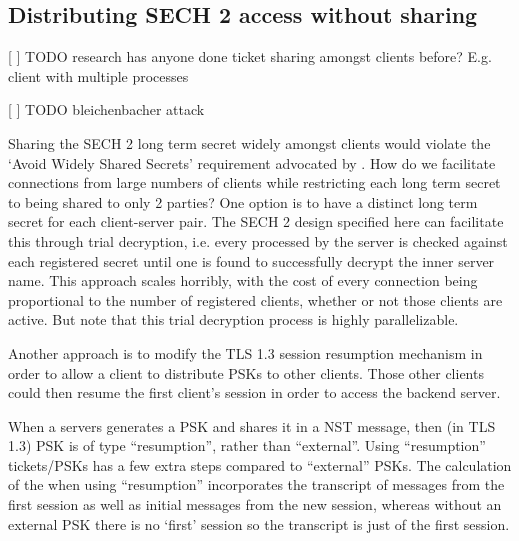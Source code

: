 \subsection{Distributing SECH 2 access without sharing }
[ ] TODO research has anyone done ticket sharing amongst clients before? E.g. client with multiple processes

[ ] TODO bleichenbacher attack

Sharing the SECH 2 long term secret widely amongst clients would violate the `Avoid Widely Shared Secrets' requirement advocated by \citep{rfc8744-issues}. How do we facilitate connections from large numbers of clients while restricting each long term secret to being shared to only 2 parties? One option is to have a distinct long term secret for each client-server pair. The SECH 2 design specified here can facilitate this through trial decryption, i.e. every  processed by the server is checked against each registered secret until one is found to successfully decrypt the inner server name. This approach scales horribly, with the cost of every connection being proportional to the number of registered clients, whether or not those clients are active. But note that this trial decryption process is highly parallelizable.

Another approach is to modify the TLS 1.3 session resumption mechanism in order to allow a client to distribute PSKs to other clients. Those other clients could then resume the first client's session in order to access the backend server.

When a servers generates a \ac{PSK} and shares it in a \ac{NST} message, then (in TLS 1.3) \ac{PSK} is of type ``resumption'', rather than ``external''. Using ``resumption'' tickets/\acp{PSK} has a few extra steps compared to ``external'' \acp{PSK}. The calculation of the  when using ``resumption'' incorporates the transcript of messages from the first session as well as initial messages from the new session, whereas without an external \ac{PSK} there is no `first' session so the transcript is just of the first session.

